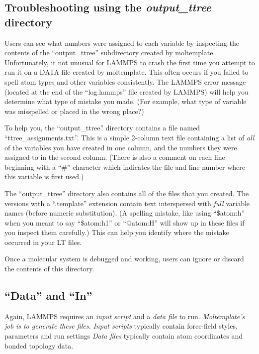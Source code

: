 \documentclass[11pt]{article}
\begin{document}
\subsection{Troubleshooting using the \textit{output\_ttree} directory}
\label{sec:output_ttree}
Users can see what numbers were assigned to each variable 
by inspecting the contents of the ``output\_ttree'' subdirectory
created by moltemplate. 
Unfortunately, it not unusual for LAMMPS to crash the first time you 
attempt to run it on a DATA file created by moltemplate.  This often occurs 
if you failed to spell atom types and other variables consistently.
The LAMMPS error message (located at the end of the ``log.lammps''
file created by LAMMPS) will help you determine what type of mistake you made.
(For example, what type of variable was misspelled or placed in the wrong place?)


To help you, the ``output\_ttree'' directory contains a file named 
``ttree\_assignments.txt''. 
This is a simple 2-column text file containing a list of \textit{all} 
of the variables you have created in one column, and the numbers they
were assigned to in the second column.
(There is also a comment on each line beginning with a ``\#'' character which
indicates the file and line number where this variable is first used.)

The ``output\_ttree'' directory also contains all of the files that you created.
The versions with a ``.template'' extension contain text
interspersed with \textit{full} variable names (before numeric substitution).
(A spelling mistake, like using ``\$atom:h'' when you meant to say ``\$atom:h1''
or ``@atom:H'' will show up in these files if you inspect them carefully.)
This can help you identify where the mistake occurred
in your LT files.

Once a molecular system is debugged and working, users 
can ignore or discard the contents of this directory.


\subsection{``Data'' and ``In''}
\label{sec:DataIn}
Again, LAMMPS requires an \textit{input script} and a \textit{data file} 
to run.    
\textit{Moltemplate's job is to generate these files.}
\textit{Input scripts} typically contain
force-field styles, parameters and run settings
\textit{Data files} typically contain atom 
coordinates and bonded topology data.
\end{document}
